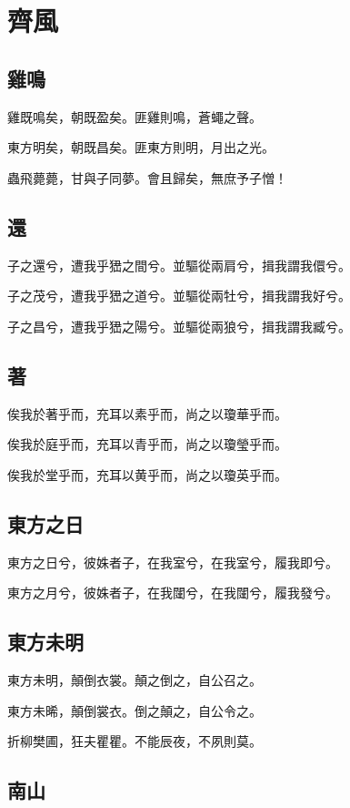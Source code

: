 \section[齊風]{齊風}

\subsection[雞鳴]{雞鳴}

雞既鳴矣，朝既盈矣。匪雞則鳴，蒼蠅之聲。

東方明矣，朝既昌矣。匪東方則明，月出之光。

蟲飛薨薨，甘與子同夢。會且歸矣，無庶予子憎！

\subsection[還]{還}

子之還兮，遭我乎峱之間兮。並驅從兩肩兮，揖我謂我儇兮。

子之茂兮，遭我乎峱之道兮。並驅從兩牡兮，揖我謂我好兮。

子之昌兮，遭我乎峱之陽兮。並驅從兩狼兮，揖我謂我臧兮。

\subsection[著]{著}

俟我於著乎而，充耳以素乎而，尚之以瓊華乎而。

俟我於庭乎而，充耳以青乎而，尚之以瓊瑩乎而。

俟我於堂乎而，充耳以黄乎而，尚之以瓊英乎而。

\subsection[東方之日]{東方之日}

東方之日兮，彼姝者子，在我室兮，在我室兮，履我即兮。

東方之月兮，彼姝者子，在我闥兮，在我闥兮，履我發兮。

\subsection[東方未明]{東方未明}

東方未明，顛倒衣裳。顛之倒之，自公召之。

東方未晞，顛倒裳衣。倒之顛之，自公令之。

折柳樊圃，狂夫瞿瞿。不能辰夜，不夙則莫。

\subsection[南山]{南山}

